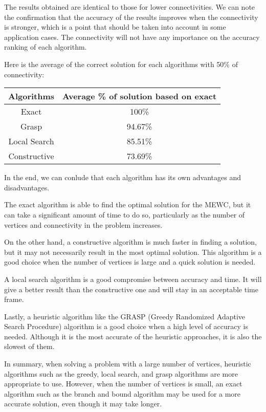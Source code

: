 The results obtained are identical to those for lower connectivities. We can note the confirmation that the accuracy of the results improves when the connectivity is stronger, which is a point that should be taken into account in some application cases. The connectivity will not have any importance on the accuracy ranking of each algorithm. \bigskip

Here is the average of the correct solution for each algorithms with 50\% of connectivity: \bigskip

\begin{center}
    \begin{tabular}{|c|c|}
        \hline
        \textbf{Algorithms} & \textbf{Average \% of solution based on exact}                         \\
        \hline
        Exact & 100\% \\
        Grasp & 94.67\% \\
        Local Search & 85.51\% \\
        Constructive & 73.69\% \\
        \hline
    \end{tabular}
\end{center}

In the end, we can conlude that each algorithm has its own advantages and disadvantages. \bigskip

The exact algorithm is able to find the optimal solution for the MEWC, but it can take a significant amount of time to do so, particularly as the number of vertices and connectivity in the problem increases. \bigskip

On the other hand, a constructive algorithm is much faster in finding a solution, but it may not necessarily result in the most optimal solution. This algorithm is a good choice when the number of vertices is large and a quick solution is needed. \bigskip

A local search algorithm is a good compromise between accuracy and time. It will give a better result than the constructive one and will stay in an acceptable time frame. \bigskip

Lastly, a heuristic algorithm like the GRASP (Greedy Randomized Adaptive Search Procedure) algorithm is a good choice when a high level of accuracy is needed. Although it is the most accurate of the heuristic approaches, it is also the slowest of them. \bigskip

In summary, when solving a problem with a large number of vertices, heuristic algorithms such as the greedy, local search, and grasp algorithms are more appropriate to use. However, when the number of vertices is small, an exact algorithm such as the branch and bound algorithm may be used for a more accurate solution, even though it may take longer. \bigskip